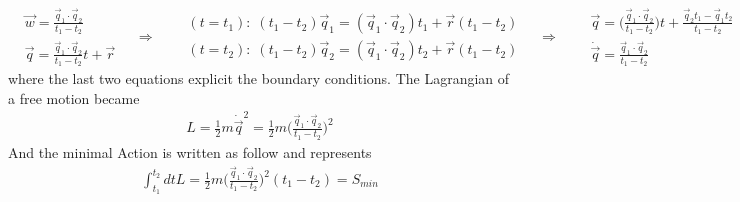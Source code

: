 \documentclass[class=article]{standalone}
\begin{document}
\begin{equation*}
\begin{split}
& \vec w = \frac{\vec q_1 \cdot \vec q_2}{t_1 - t_2} \\
& \vec q =  \frac{\vec q_1 \cdot \vec q_2}{t_1 - t_2} t + \vec r
\end{split}\quad\Rightarrow\quad
\begin{split}
& (t= t_1) : \; (t_1 - t_2) \vec q_1 =  (\vec q_1 \cdot \vec q_2) t_1 + \vec r (t_1 - t_2) \\
& (t= t_2) : \; (t_1 - t_2) \vec q_2 =  (\vec q_1 \cdot \vec q_2) t_2 + \vec r (t_1 - t_2) 
\end{split}\quad\Rightarrow\quad
\begin{split}
& \vec q = \Big( \frac{\vec q_1 \cdot \vec q_2}{t_1 - t_2} \Big) t + \frac{\vec q_2 t_1 - \vec q_1 t_2}{t_1 - t_2} \\
& \dot \vec q =  \frac{\vec q_1 \cdot \vec q_2}{t_1 - t_2}  
\end{split}
\end{equation*}
where the last two equations explicit the boundary conditions. 
The Lagrangian of a free motion became
\begin{equation*}
\begin{split}
L = \frac{1}{2} m \dot \vec q^2 = \frac{1}{2} m \Big( \frac{\vec q_1 \cdot \vec q_2}{t_1 - t_2} \Big)^2
\end{split}
\end{equation*}
And the minimal Action is written as follow and represents 
\begin{equation*}
\begin{split}
\int_{t_1}^{t_2} dt L = \frac{1}{2} m \Big(   \frac{\vec q_1 \cdot \vec q_2}{t_1 - t_2}  \Big)^2 (t_1 - t_2)  = S_{min}
\end{split}
\end{equation*}

\begin{center}
\end{center}
\end{document}
